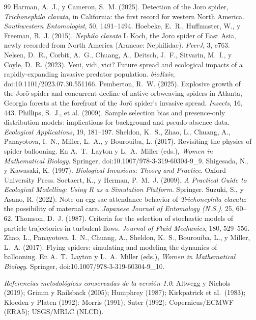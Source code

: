 \documentclass[11pt,letterpaper]{article}
\begin{document}
\begin{thebibliography}{99}
 Harman, A.~J., y Cameron, S.~M. (2025). Detection of the Joro spider, \textit{Trichonephila clavata}, in California: the first record for western North America. \textit{Southwestern Entomologist}, 50, 1491--1494.
 Hoebeke, E.~R., Huffmaster, W., y Freeman, B.~J. (2015). \textit{Nephila clavata} L Koch, the Joro spider of East Asia, newly recorded from North America (Araneae: Nephilidae). \textit{PeerJ}, 3, e763.
 Nelsen, D.~R., Corbit, A.~G., Chuang, A., Deitsch, J.~F., Sitvarin, M.~I., y Coyle, D.~R. (2023). Veni, vidi, vici? Future spread and ecological impacts of a rapidly-expanding invasive predator population. \textit{bioRxiv}, doi:10.1101/2023.07.30.551166.
 Pemberton, R.~W. (2025). Explosive growth of the Jorō spider and concurrent decline of native orbweaving spiders in Atlanta, Georgia forests at the forefront of the Jorō spider's invasive spread. \textit{Insects}, 16, 443.
 Phillips, S.~J., et al. (2009). Sample selection bias and presence-only distribution models: implications for background and pseudo-absence data. \textit{Ecological Applications}, 19, 181--197.
 Sheldon, K.~S., Zhao, L., Chuang, A., Panayotova, I.~N., Miller, L.~A., y Bourouiba, L. (2017). Revisiting the physics of spider ballooning. En A.~T.~Layton y L.~A.~Miller (eds.), \textit{Women in Mathematical Biology}. Springer, doi:10.1007/978-3-319-60304-9\_9.
 Shigesada, N., y Kawasaki, K. (1997). \textit{Biological Invasions: Theory and Practice}. Oxford University Press.
 Soetaert, K., y Herman, P.~M.~J. (2009). \textit{A Practical Guide to Ecological Modelling: Using R as a Simulation Platform}. Springer.
 Suzuki, S., y Asano, R. (2022). Note on egg sac attendance behavior of \textit{Trichonephila clavata}: the possibility of maternal care. \textit{Japanese Journal of Entomology (N.S.)}, 25, 60--62.
 Thomson, D.~J. (1987). Criteria for the selection of stochastic models of particle trajectories in turbulent flows. \textit{Journal of Fluid Mechanics}, 180, 529--556.
 Zhao, L., Panayotova, I.~N., Chuang, A., Sheldon, K.~S., Bourouiba, L., y Miller, L.~A. (2017). Flying spiders: simulating and modeling the dynamics of ballooning. En A.~T.~Layton y L.~A.~Miller (eds.), \textit{Women in Mathematical Biology}. Springer, doi:10.1007/978-3-319-60304-9\_10.
\end{thebibliography}

\textit{Referencias metodológicas conservadas de la versión 1.0}: Altwegg y Nichols (2019); Grimm y Railsback (2005); Humphrey (1987); Kirkpatrick et al.\ (1983); Kloeden y Platen (1992); Morris (1991); Suter (1992); Copernicus/ECMWF (ERA5); USGS/MRLC (NLCD).
\end{document}
